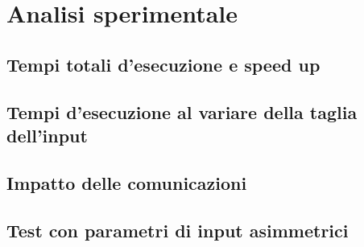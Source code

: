 \chapter{Analisi sperimentale}

\section{Tempi totali d'esecuzione e speed up}

\section{Tempi d'esecuzione al variare della taglia dell'input}

\section{Impatto delle comunicazioni}

\section{Test con parametri di input asimmetrici}